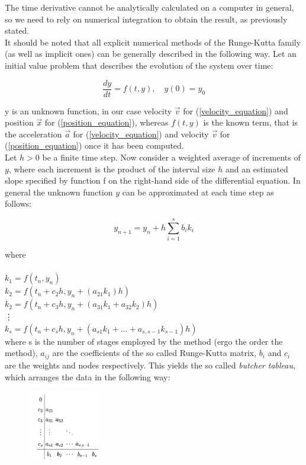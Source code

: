 \documentclass{article}
\begin{document}
\noindent The time derivative cannot be analytically calculated on a computer in general, so we need to rely on numerical integration to obtain the result, as previously stated. \\
It should be noted that all explicit numerical methods of the Runge-Kutta family (as well as implicit ones) can be generally described in the following way.
Let an initial value problem that describes the evolution of the system over time:  \cite{press1996numerical}

$$\frac{dy}{dt} = f(t,y), \quad y(0) = y_0 $$

\noindent y is an unknown function, in our case velocity $\vec{v}$ for (\ref{velocity_equation}) and position $\vec{x}$ for (\ref{position_equation}), whereas $f(t,y)$ is the known term, that is the acceleration $\Vec{a}$ for (\ref{velocity_equation}) and velocity $\vec{v}$ for (\ref{position_equation}) once it has been computed. \\
Let $h>0$ be a finite time step. Now consider a weighted average of increments of $y$, where each increment is the product of the interval size $h$ and an estimated slope specified by function f on the right-hand side of the differential equation. 
In general the unknown function $y$ can be approximated at each time step as follows:

$$y_{n+1} = y_n + h \sum_{i = 1}^{s} b_ik_i$$ 

\noindent where \\ \\
$k_1 = f(t_n,y_n)$ \\ 
$k_2 = f(t_n + c_2h,y_n + (a_{21}k_1)h)$ \\
$k_2 = f(t_n + c_3h,y_n + (a_{31}k_1 + a_{32}k_2)h)$ \\
\vdots\\
$k_s = f(t_n + c_sh,y_n + (a_{s1}k_1 + ... +  a_{s,s-1}k_{s-1})h)$ \\

\noindent where s is the number of stages employed by the method (ergo the order the method), $a_{ij}$ are the coefficients of the so called Runge-Kutta matrix, $b_i$ and $c_i$ are the weights and nodes respectively. This yields the so called \textit{butcher tableau}, which arranges the data in the following way:  \cite{enwiki:1189959645}

\begin{figure} [h]
    \includegraphics[width=0.3\textwidth]
    {images/butcher_tableau.png}
    \label{fig:my_label}
\end{figure}
\end{document}
